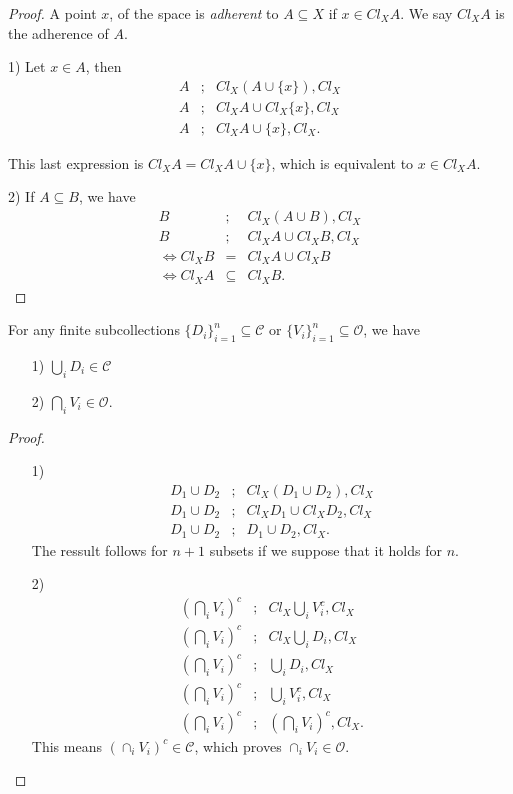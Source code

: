 \documentclass [12pt]{book}
\begin{document}
\begin{proof}A point $x$, of the space is \textit{adherent} to $A\subseteq X$ if $x\in Cl_XA$. We say $Cl_XA$ is the adherence of $A$.

\item[1)]Let $x\in A$, then\begin{eqnarray}\nonumber A&;&Cl_X(A\cup \{x\}),Cl_X\\\nonumber A&;&Cl_XA\cup Cl_X\{x\},Cl_X\\\nonumber A&;&Cl_XA\cup \{x\},Cl_X.\end{eqnarray}

This last expression is $Cl_XA=Cl_XA\cup \{x\}$, which is equivalent to $x\in Cl_XA$.

\item[2)]If $A\subseteq B$, we have\begin{eqnarray}\nonumber B&;&Cl_X(A\cup B),Cl_X\\\nonumber B&;&Cl_XA\cup Cl_XB,Cl_X\\\nonumber\Leftrightarrow Cl_XB&=&Cl_XA\cup Cl_XB\\\nonumber\Leftrightarrow Cl_XA&\subseteq&Cl_XB.\end{eqnarray}

\end{proof}

\begin{theorem}For any finite subcollections $\{D_{i}\}^{n}_{i=1}\subseteq\mathcal{C}$ or $\{V_{i}\}^{n}_{i=1}\subseteq\mathcal{O}$, we have
\begin{itemize}\item[1)]$\bigcup_{i}D_{i}\in\mathcal{C}$\item[2)]$\bigcap_{i}
V_{i}\in\mathcal{O}$.\end{itemize}\end{theorem}

\begin{proof}\begin{itemize}\item[1)]\begin{eqnarray}\nonumber D_{1}\cup D_2&;&Cl_X(D_1\cup D_2),Cl_X\\\nonumber D_{1}\cup D_2&;&Cl_XD_1\cup Cl_XD_2,Cl_X\\\nonumber D_{1}\cup D_2&;&D_1\cup D_2,Cl_X.\end{eqnarray}
The ressult follows for $n+1$ subsets if we suppose that it holds for $n$.\item[2)] \begin{eqnarray}\nonumber \left(\bigcap_i V_i\right)^c&;&Cl_X\bigcup_i V^c_i,Cl_X\\\nonumber \left(\bigcap_i V_i\right)^c&;&Cl_X\bigcup_i D_i,Cl_X\\\nonumber \left(\bigcap_i V_i\right)^c&;&\bigcup_i D_i,Cl_X\\\nonumber \left(\bigcap_i V_i\right)^c&;&\bigcup_i V_i^c,Cl_X\\\nonumber \left(\bigcap_i V_i\right)^c&;&\left(\bigcap_i V_i\right)^c,Cl_X.\end{eqnarray}This means $(\cap_i V_i)^c\in\mathcal{C}$, which proves $\cap_i V_i\in\mathcal{O}$.\end{itemize}\end{proof}
\end{document}
